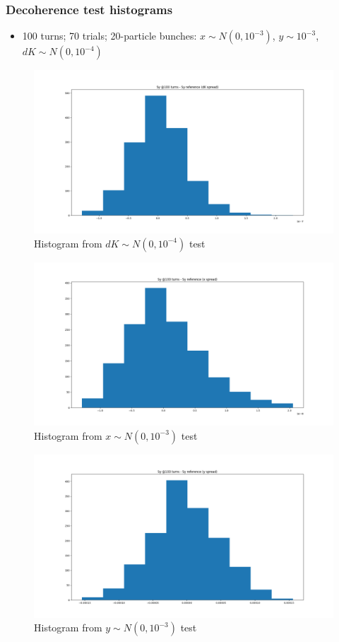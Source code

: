 \documentclass[pdf]{beamer}
\begin{document}
	\begin{frame}
		\frametitle{Decoherence test histograms}
		\begin{itemize}
			\item 100 turns; 70 trials; 20-particle bunches: $x \sim N(0, 10^{-3})$, $y \sim 10^{-3}$, $dK \sim N(0, 10^{-4})$
		\end{itemize}
		\begin{figure}
			\includegraphics[scale=.25]{Sy_hist_dK}
			\caption{Histogram from $dK \sim N(0, 10^{-4})$ test}
		\end{figure}
	\end{frame}
	\begin{frame}
		\begin{figure}
			\includegraphics[scale=.3]{Sy_hist_x}
			\caption{Histogram from $x \sim N(0, 10^{-3})$ test}
		\end{figure}
	\end{frame}
	\begin{frame}
		\begin{figure}
			\includegraphics[scale=.3]{Sy_hist_y}
			\caption{Histogram from $y \sim N(0, 10^{-3})$ test}
		\end{figure}
	\end{frame}
\end{document}
